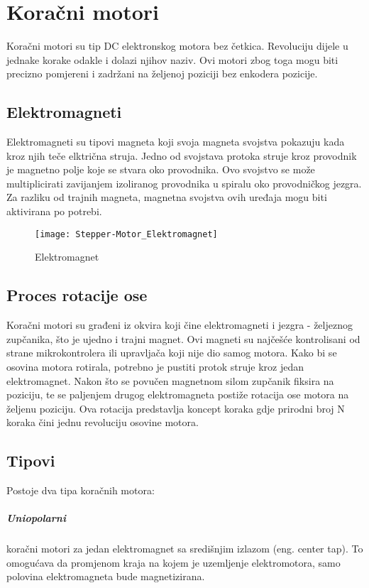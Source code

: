 \documentclass[../Document.tex]{subfiles}
\begin{document}
\section{Koračni motori}
Koračni motori su tip DC elektronskog motora bez četkica. Revoluciju dijele u jednake korake odakle i dolazi njihov naziv. Ovi motori zbog toga mogu biti precizno pomjereni i zadržani na željenoj poziciji bez enkodera pozicije.
\vspace{0.5cm}
\subsection{Elektromagneti}
Elektromagneti su tipovi magneta koji svoja magneta svojstva pokazuju kada kroz njih teče elktrična struja. Jedno od svojstava protoka struje kroz provodnik je magnetno polje koje se stvara oko provodnika. Ovo svojstvo se može multiplicirati zavijanjem izoliranog provodnika u spiralu oko provodničkog jezgra. Za razliku od trajnih magneta, magnetna svojstva ovih uređaja mogu biti aktivirana po potrebi.\\

\begin{figure}[h]
    \centering
    \hspace{1.8cm}
    \texttt{[image: Stepper-Motor\_Elektromagnet]}
    \caption{Elektromagnet}
\end{figure}

\subsection{Proces rotacije ose}
Koračni motori su građeni iz okvira koji čine elektromagneti i jezgra - željeznog zupčanika, što je ujedno i trajni magnet. Ovi magneti su najčešće kontrolisani od strane mikrokontrolera ili upravljača koji nije dio samog motora. Kako bi se osovina motora rotirala, potrebno je pustiti protok struje kroz jedan elektromagnet. Nakon što se povučen magnetnom silom zupčanik fiksira na poziciju, te se paljenjem drugog elektromagneta postiže rotacija ose motora na željenu poziciju. Ova rotacija predstavlja koncept koraka gdje prirodni broj N koraka čini jednu revoluciju osovine motora.

\subsection{Tipovi}
Postoje dva tipa koračnih motora:

\subparagraph{Uniopolarni} \noindent koračni motori za jedan elektromagnet sa središnjim izlazom (eng. center tap). To omogućava da promjenom kraja na kojem je uzemljenje elektromotora, samo polovina elektromagneta bude magnetizirana.\\
\end{document}
